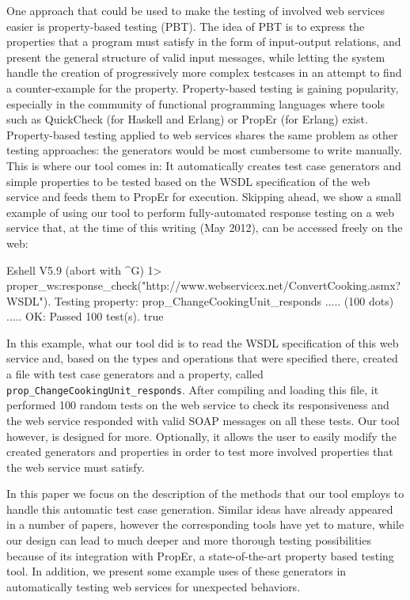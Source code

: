 \documentclass[submission,copyright]{eptcs}
\begin{document}
One approach that could be used to make the testing of involved web
services easier is property-based testing (PBT). The idea of PBT is to
express the properties that a program must satisfy in the form of
input-output relations, and present the general structure of valid
input messages, while letting the system handle the creation of
progressively more complex testcases in an attempt to find a
counter-example for the property. Property-based testing is gaining
popularity, especially in the community of functional programming
languages where tools such as QuickCheck (for Haskell and Erlang) or
PropEr (for Erlang) exist.
%
Property-based testing applied to web services shares the same problem
as other testing approaches: the generators would be most cumbersome
to write manually. This is where our tool comes in: It automatically
creates test case generators and simple properties to be tested based
on the WSDL specification of the web service and feeds them to PropEr
for execution.
%
Skipping ahead, we show a small example of using our tool to perform
fully-automated response testing on a web service that, at the time of
this writing (May 2012), can be accessed freely on the web:

\begin{lstoutput}
Eshell V5.9 (abort with ^G)
1> proper_ws:response_check("http://www.webservicex.net/ConvertCooking.asmx?WSDL").
Testing property: prop_ChangeCookingUnit_responds
..... (100 dots) .....
OK: Passed 100 test(s).
true
\end{lstoutput}

In this example, what our tool did is to read the WSDL specification
of this web service and, based on the types and operations that were
specified there, created a file with test case generators and a
property, called \texttt{prop\_ChangeCookingUnit\_responds}. After
compiling and loading this file, it performed 100 random tests on the
web service to check its responsiveness and the web service responded
with valid SOAP messages on all these tests. Our tool however, is
designed for more. Optionally, it allows the user to easily modify the
created generators and properties in order to test more involved
properties that the web service must satisfy.


In this paper we focus on the description of the methods that our tool
employs to handle this automatic test case generation. Similar ideas
have already appeared in a number of papers, however the corresponding
tools have yet to mature, while our design can lead to much deeper and
more thorough testing possibilities because of its integration with
PropEr, a state-of-the-art property based testing tool. In addition,
we present some example uses of these generators in automatically
testing web services for unexpected behaviors.
\end{document}
